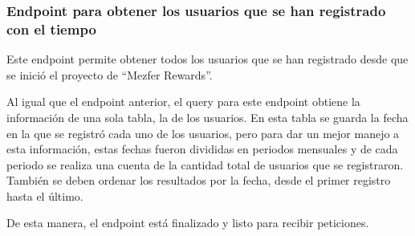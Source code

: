 \subsubsection{Endpoint para obtener los usuarios que se han registrado con el tiempo}
Este endpoint permite obtener todos los usuarios que se han registrado desde que se inició el proyecto de ``Mezfer Rewards''.

Al igual que el endpoint anterior, el query para este endpoint obtiene la información de una sola tabla, la de los usuarios. En esta tabla se guarda la fecha en la que se registró cada uno de los usuarios, pero para dar un mejor manejo a esta información, estas fechas fueron divididas en periodos mensuales y de cada periodo se realiza una cuenta de la cantidad total de usuarios que se registraron. También se deben ordenar los resultados por la fecha, desde el primer registro hasta el último.

De esta manera, el endpoint está finalizado y listo para recibir peticiones.